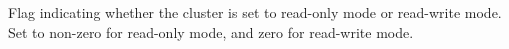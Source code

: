 Flag indicating whether the cluster is set to read-only mode or read-write mode.
Set to non-zero for read-only mode, and zero for read-write mode.
